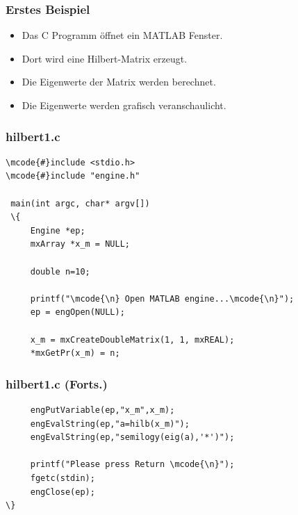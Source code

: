 %
%
\begin{frame}[fragile]\frametitle{Erstes Beispiel}
\begin{itemize}
\item Das C Programm \"offnet ein MATLAB Fenster.
\item Dort wird eine Hilbert-Matrix erzeugt.
\item Die Eigenwerte der Matrix werden berechnet.
\item Die Eigenwerte werden grafisch veranschaulicht.
\end{itemize}
\end{frame}
%
%
\begin{frame}[fragile]\frametitle{hilbert1.c}
\begin{lstlisting}
\mcode{#}include <stdio.h>
\mcode{#}include "engine.h"
 
 main(int argc, char* argv[])
 \{
     Engine *ep;
     mxArray *x_m = NULL;
     
     double n=10;
      
     printf("\mcode{\n} Open MATLAB engine...\mcode{\n}");
     ep = engOpen(NULL);
     
     x_m = mxCreateDoubleMatrix(1, 1, mxREAL);
     *mxGetPr(x_m) = n;
\end{lstlisting}
\end{frame}
%
%
%
\begin{frame}[fragile]\frametitle{hilbert1.c (Forts.)}
\begin{lstlisting}     
     engPutVariable(ep,"x_m",x_m);
     engEvalString(ep,"a=hilb(x_m)");
     engEvalString(ep,"semilogy(eig(a),'*')");
     
     printf("Please press Return \mcode{\n}");
     fgetc(stdin);
     engClose(ep);
\}
\end{lstlisting}
\end{frame}
%
%

